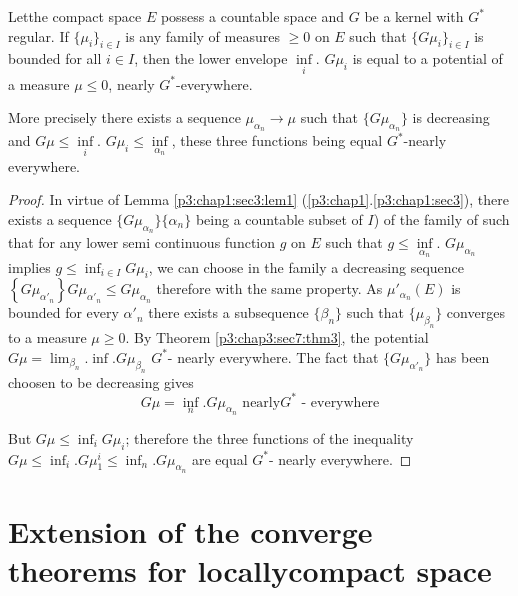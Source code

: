 \begin{thm}\label{p3:chap3:sec7:thm6}%
  Let\pageoriginale the compact space $E$ possess a countable space  and $G$ be a
  kernel with $G^*$ regular.  If $\{\mu_i \} _{ i \in I}$ is any
  family of measures $\geq 0$ on $E$ such that $\{G \mu _i \}_{i \in
    I}$ is bounded for all $i \in I$, then the lower envelope
  $\inf\limits_{i}$. $G \mu_i$ is equal to a potential of a measure $\mu
  \leq 0$, nearly $G^*$-everywhere.  
\end{thm}

More precisely there exists a sequence $ \mu _{\alpha _n} \to \mu$
such that $\{ G \mu _{\alpha _n}\}$ is decreasing and $G \mu \leq
\inf\limits_i$. $G \mu_i \leq \inf\limits_{\alpha_n}$, these three
functions being equal $G^*$-nearly everywhere.  

\begin{proof}
  In virtue of Lemma \ref{p3:chap1:sec3:lem1}
  (\ref{p3:chap1}.\ref{p3:chap1:sec3}), there exists a  
  sequence $\{ G \mu _{ 
    \alpha _n }\}$\break $\{\alpha _{n}\}$  being a countable subset of $I$)
  of the family of such that for any lower semi continuous function
  $g$ on $E$ such that $g \leq \inf\limits_{\alpha _n }$. $G
  \mu_{\alpha_n}$ implies
  $g\leq \inf _{i \in I} G\mu_i$, we can choose in the family a
  decreasing sequence $\left\{G \mu_{\alpha'_n} \right\} G
  \mu_{\alpha'_n} \leq G\mu_{\alpha_n}$ therefore with the same
  property. As $\mu' 
  _{\alpha_n} (E)$ is bounded for every $\alpha'_n$ there exists a
  subsequence $\{ \beta _n \}$ such that $\{\mu _{\beta_n}\}$
  converges to a measure $\mu \geq 0$. By Theorem
  \ref{p3:chap3:sec7:thm3}, the potential 
  $G \mu = \lim _{\beta_n}.  \inf.  G \mu_{\beta _n}$ $G^*$- nearly
  everywhere. The fact that $\{G\mu_{\alpha'_n}\}$ has been choosen
  to be decreasing gives  
  $$
  G \mu = \inf_n.  G \mu _{\alpha _n} \text{ nearly}G^* \text{ - everywhere}
  $$
  
  But $G \mu \leq \inf_i G\mu_i$; therefore the three functions of the
  inequality $G \mu \leq \inf _i. G\mu^i _1 \leq \inf_n.  G \mu_{
    \alpha _n}$ are equal $G^* $- nearly everywhere.  
\end{proof}

\section[Extension of the converge...]{Extension of the converge theorems for locally\break compact
  space}\label{p3:chap3:sec8} %

